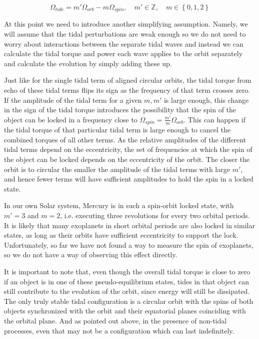\begin{equation}
%
    \Omega_{tide} = m' \Omega_{orb} - m \Omega_{spin},
%
    \quad m' \in \mathbb{Z},\quad m \in \left\{0, 1, 2\right\}
%
\end{equation}

At this point we need to introduce another simplifying assumption. Namely, we
will assume that the tidal perturbations are weak enough so we do not need to
worry about interactions between the separate tidal waves and instead we can
calculate the tidal torque and power each wave applies to the orbit separately
and calculate the evolution by simply adding these up.

Just like for the single tidal term of aligned circular orbits, the tidal torque
from echo of these tidal terms flips its sign as the frequency of that term
crosses zero. If the amplitude of the tidal term for a given $m,m'$ is large
enough, this change in the sign of the tidal torque introduces the
possibility that the spin of the object can be locked in a frequency close to
$\Omega_{spin}=\frac{m'}{m} \Omega_{orb}$. This can happen if the tidal torque
of that particular tidal term is large enough to cancel the combined torques of
all other terms. As the relative amplitudes of the different tidal terms depend
on the eccentricity, the set of frequencies at which the spin of the object can
be locked depends on the eccentricity of the orbit. The closer the orbit is to
circular the smaller the amplitude of the tidal terms with large $m'$, and hence
fewer terms will have sufficient amplitudes to hold the spin in a locked state.

In our own Solar system, Mercury is in such a spin-orbit locked state, with
$m'=3$ and $m=2$, i.e. executing three revolutions for every two orbital
periods. It is likely that many exoplanets in short orbital periods are also
locked in similar states, as long as their orbits have sufficient eccentricity
to support the lock. Unfortunately, so far we have not found a way to measure
the spin of exoplanets, so we do not have a way of observing this effect
directly.

It is important to note that, even though the overall tidal torque is close to
zero if an object is in one of these pseudo-equilibrium states, tides in that
object can still contribute to the evolution of the orbit, since energy will
still be dissipated. The only truly stable tidal configuration is a circular
orbit with the spins of both objects synchronized with the orbit and their
equatorial planes coinciding with the orbital plane. And as pointed out above,
in the presence of non-tidal processes, even that may not be a configuration
which can last indefinitely.
